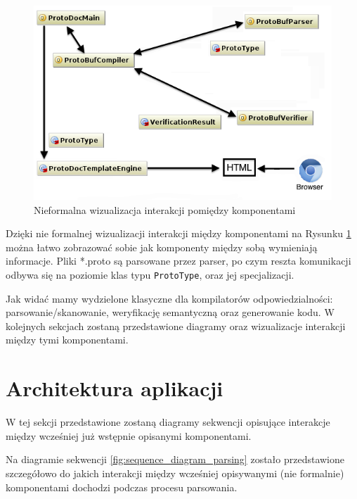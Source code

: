 \documentclass[pdflatex,11pt]{aghdpl}
\begin{document}
\begin{figure}[ch!]
\begin{center}
 \includegraphics[scale=0.85]{main_classes.png}
\end{center}
\caption{Nieformalna wizualizacja interakcji pomiędzy komponentami}
\label{simple_visualization}
\end{figure}

Dzięki nie formalnej wizualizacji interakcji między komponentami na Rysunku \ref{simple_visualization} można łatwo zobrazować sobie
jak komponenty między sobą wymieniają informacje. Pliki *.proto są parsowane przez parser, po czym reszta komunikacji odbywa się na poziomie 
klas typu \verb|ProtoType|, oraz jej specjalizacji.

Jak widać mamy wydzielone klasyczne dla kompilatorów odpowiedzialności: parsowanie/skanowanie, weryfikację semantyczną oraz generowanie kodu.
W kolejnych sekcjach zostaną przedstawione diagramy oraz wizualizacje interakcji między tymi komponentami.

\section{Architektura aplikacji}
\label{sec:sequence_diagrams}

W tej sekcji przedstawione zostaną diagramy sekwencji opisujące interakcje między wcześniej już wstępnie opisanymi komponentami.



Na diagramie sekwencji \ref{fig:sequence_diagram_parsing} zostało przedstawione szczegółowo do jakich interakcji między wcześniej opisywanymi (nie formalnie)
komponentami dochodzi podczas procesu parsowania. 
\end{document}
